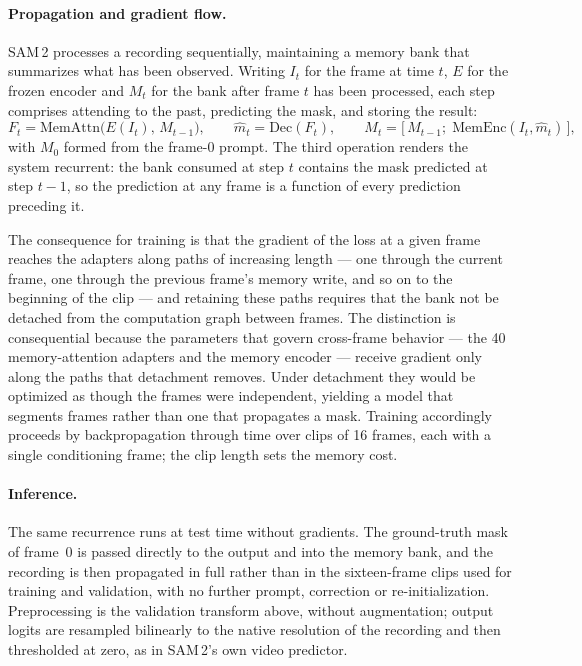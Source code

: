 \documentclass[11pt,a4paper]{article}
\begin{document}
\paragraph{Propagation and gradient flow.}
SAM\,2 processes a recording sequentially, maintaining a memory bank that
summarizes what has been observed. Writing $I_t$ for the frame at time $t$,
$E$ for the frozen encoder and $M_t$ for the bank after frame $t$ has been
processed, each step comprises attending to the past, predicting the mask,
and storing the result:
\begin{equation}
F_t = \mathrm{MemAttn}\!\big(E(I_t),\, M_{t-1}\big),
\qquad
\hat{m}_t = \mathrm{Dec}(F_t),
\qquad
M_t = \big[\, M_{t-1};\; \mathrm{MemEnc}(I_t, \hat{m}_t) \,\big],
\label{eq:recurrence}
\end{equation}
with $M_0$ formed from the frame-0 prompt. The third operation renders the
system recurrent: the bank consumed at step $t$ contains the mask predicted
at step $t-1$, so the prediction at any frame is a function of every
prediction preceding it.

The consequence for training is that the gradient of the loss at a given
frame reaches the adapters along paths of increasing length --- one through
the current frame, one through the previous frame's memory write, and so on
to the beginning of the clip --- and retaining these paths requires that the
bank not be detached from the computation graph between frames. The distinction is consequential because the parameters that govern cross-frame behavior --- the 40 memory-attention
adapters and the memory encoder --- receive gradient only along the paths
that detachment removes. Under detachment they would be optimized as though
the frames were independent, yielding a model that segments frames rather
than one that propagates a mask. Training accordingly proceeds by
backpropagation through time over clips of 16 frames, each with a single
conditioning frame; the clip length sets the memory cost.

\paragraph{Inference.}
The same recurrence runs at test time without gradients. The ground-truth
mask of frame~0 is passed directly to the output and into the memory bank,
and the recording is then propagated in full rather
than in the sixteen-frame clips used for training and validation, with no
further prompt, correction or re-initialization. Preprocessing is the validation transform
above, without augmentation; output logits are resampled bilinearly to the
native resolution of the recording and then thresholded at zero, as in
SAM\,2's own video predictor.
\end{document}
